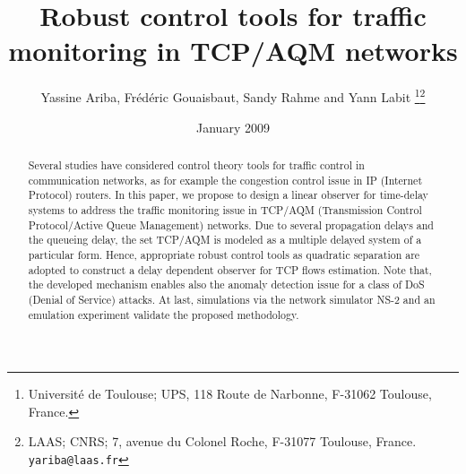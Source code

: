 \documentclass[a4paper, 10pt, onecolumn]{article}
\title{\LARGE \bf
Robust control tools for traffic monitoring in TCP/AQM networks
}
\author{Yassine Ariba, Fr\'ed\'eric Gouaisbaut, Sandy Rahme and Yann Labit \thanks{ Universit\'e de Toulouse; UPS, 118 Route de Narbonne, F-31062 Toulouse, France.}\thanks{ LAAS; CNRS;  7, avenue du Colonel Roche, F-31077 Toulouse, France.
        {\tt\small yariba@laas.fr}}}
\date{January 2009}
\begin{document}
\maketitle
\thispagestyle{empty}
\pagestyle{empty}


\begin{abstract}
Several studies have considered control theory tools for traffic control in communication networks, as for example the congestion control issue in IP (Internet Protocol) routers. In this paper, we propose to design a linear observer for time-delay systems to address the traffic monitoring issue in TCP/AQM (Transmission Control Protocol/Active Queue Management) networks. Due to several propagation delays and the queueing delay, the set TCP/AQM is modeled as a multiple delayed system of a particular form. Hence, appropriate robust control tools as quadratic separation are adopted to construct a delay dependent observer for TCP flows estimation. Note that, the developed mechanism enables also the anomaly detection issue for a class of DoS (Denial of Service) attacks. At last, simulations via the network simulator NS-2 and an emulation experiment validate the proposed methodology.

\end{abstract}
\end{document}

